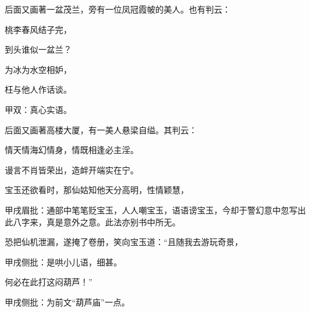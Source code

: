 \begin{parag}
    后面又画著一盆茂兰，旁有一位凤冠霞帔的美人。也有判云：
\end{parag}


\begin{poem}
    \begin{pl}桃李春风结子完，\end{pl}

    \begin{pl}到头谁似一盆兰？\end{pl}

    \begin{pl}为冰为水空相妒，\end{pl}

    \begin{pl}枉与他人作话谈。\end{pl}\begin{note}甲双：真心实语。\end{note}

\end{poem}


\begin{parag}
    后面又画著高楼大厦，有一美人悬梁自缢。其判云：
\end{parag}


\begin{poem}
    \begin{pl}情天情海幻情身，情既相逢必主淫。\end{pl}

    \begin{pl}谩言不肖皆荣出，造衅开端实在宁。\end{pl}
\end{poem}


\begin{parag}
    宝玉还欲看时，那仙姑知他天分高明，性情颖慧，\begin{note}甲戌眉批：通部中笔笔贬宝玉，人人嘲宝玉，语语谤宝玉，今却于警幻意中忽写出此八字来，真是意外之意。此法亦别书中所无。\end{note}恐把仙机泄漏，遂掩了卷册，笑向宝玉道：“且随我去游玩奇景，\begin{note}甲戌侧批：是哄小儿语，细甚。\end{note}何必在此打这闷葫芦！”\begin{note}甲戌侧批：为前文“葫芦庙”一点。\end{note}
\end{parag}


